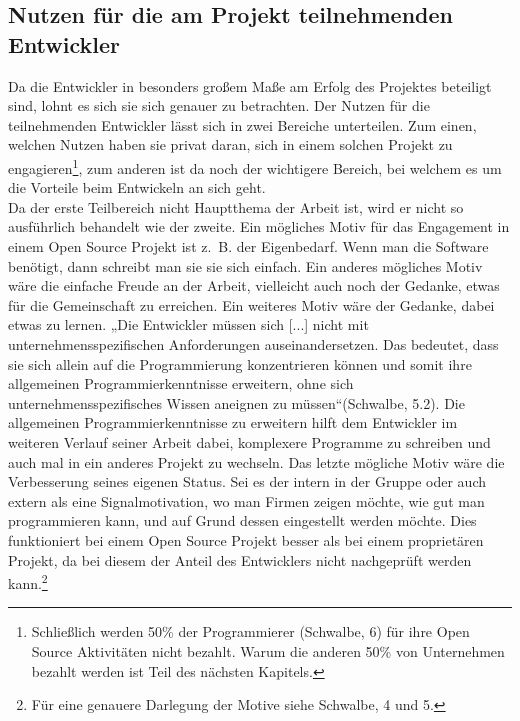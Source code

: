\documentclass[a4paper,12pt]{article}
\begin{document}
\subsection{Nutzen für die am Projekt teilnehmenden Entwickler}
Da die Entwickler in besonders großem Maße am Erfolg des Projektes beteiligt sind, lohnt es sich sie sich genauer zu betrachten. Der Nutzen für die teilnehmenden Entwickler lässt sich in zwei Bereiche unterteilen. Zum einen, welchen Nutzen haben sie privat daran, sich in einem solchen Projekt zu engagieren\footnote{Schließlich werden 50\% der Programmierer (Schwalbe, 6) für ihre Open Source Aktivitäten nicht bezahlt. Warum die anderen 50\% von Unternehmen bezahlt werden ist Teil des nächsten Kapitels.}, zum anderen ist da noch der wichtigere Bereich, bei welchem es um die Vorteile beim Entwickeln an sich geht.\\
Da der erste Teilbereich nicht Hauptthema der Arbeit ist, wird er nicht so ausführlich behandelt wie der zweite. Ein mögliches Motiv für das Engagement in einem Open Source Projekt ist z.~B. der Eigenbedarf. Wenn man die Software benötigt, dann schreibt man sie sie sich einfach. Ein anderes mögliches Motiv wäre die einfache Freude an der Arbeit, vielleicht auch noch der Gedanke, etwas für die Gemeinschaft zu erreichen. Ein weiteres Motiv wäre der Gedanke, dabei etwas zu lernen. „Die Entwickler müssen sich [...] nicht mit unternehmensspezifischen Anforderungen auseinandersetzen. Das bedeutet, dass sie sich allein auf die Programmierung konzentrieren können und somit ihre allgemeinen Programmierkenntnisse erweitern, ohne sich unternehmensspezifisches Wissen aneignen zu müssen“(Schwalbe, 5.2). Die allgemeinen Programmierkenntnisse zu erweitern hilft dem Entwickler im weiteren Verlauf seiner Arbeit dabei, komplexere Programme zu schreiben und auch mal in ein anderes Projekt zu wechseln. Das letzte mögliche Motiv wäre die Verbesserung seines eigenen Status. Sei es der intern in der Gruppe oder auch extern als eine Signalmotivation, wo man Firmen zeigen möchte, wie gut man programmieren kann, und auf Grund dessen eingestellt werden möchte. Dies funktioniert bei einem Open Source Projekt besser als bei einem proprietären Projekt, da bei diesem der Anteil des Entwicklers nicht nachgeprüft werden kann.\footnote{Für eine genauere Darlegung der Motive siehe Schwalbe, 4 und 5.}\\
\end{document}
